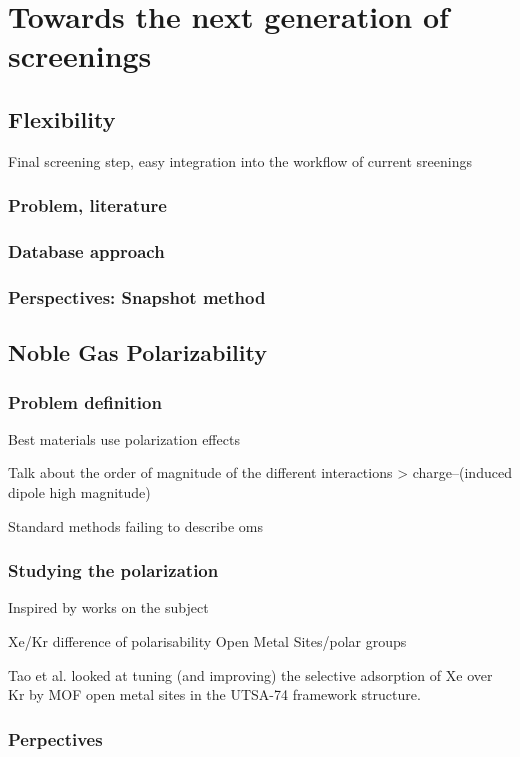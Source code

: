 \documentclass[main]{subfiles}
\begin{document}
\chapter{Towards the next generation of screenings}
\vspace*{-1\baselineskip}
\section{Flexibility}
Final screening step, easy integration into the workflow of current sreenings
\subsection{Problem, literature}

\subsection{Database approach}

\subsection{Perspectives: Snapshot method}

\section{Noble Gas Polarizability}

\subsection{Problem definition}

Best materials use polarization effects \cite{Li_2019,Pei_2022}

Talk about the order of magnitude of the different interactions > charge--(induced dipole high magnitude)

Standard methods failing to describe oms\cite{Perry_2014} 



\subsection{Studying the polarization}

Inspired by works on the subject\cite{Lachet_1998,Becker_2017} 


Xe/Kr difference of polarisability
Open Metal Sites/polar groups

Tao et al.\cite{Tao_2020} looked at tuning (and improving) the selective adsorption of Xe over Kr by MOF open metal sites in the UTSA-74 framework structure.


\subsection{Perpectives}

\OnlyInSubfile{\printglobalbibliography}
\end{document}
